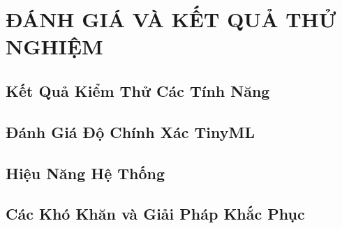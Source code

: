 \section{ĐÁNH GIÁ VÀ KẾT QUẢ THỬ NGHIỆM}

\subsection{Kết Quả Kiểm Thử Các Tính Năng}

\subsection{Đánh Giá Độ Chính Xác TinyML}

\subsection{Hiệu Năng Hệ Thống}

\subsection{Các Khó Khăn và Giải Pháp Khắc Phục}

\newpage